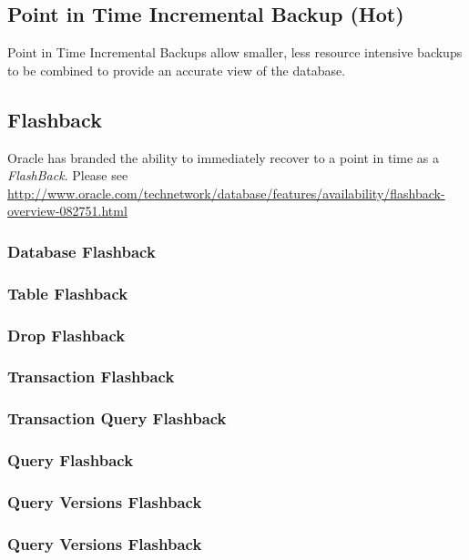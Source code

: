 \subsection{Point in Time Incremental Backup (Hot)}
Point in Time Incremental Backups allow smaller, less resource intensive backups
to be combined to provide an accurate view of the database.

\subsection{Flashback}

Oracle has branded the ability to immediately recover to a point in time as a
\emph{FlashBack}.  Please see \url{http://www.oracle.com/technetwork/database/features/availability/flashback-overview-082751.html} 

\subsubsection{Database Flashback}


\subsubsection{Table Flashback}

\subsubsection{Drop Flashback}

\subsubsection{Transaction Flashback}

\subsubsection{Transaction Query Flashback}

\subsubsection{Query Flashback}

\subsubsection{Query Versions Flashback}

\subsubsection{Query Versions Flashback}

